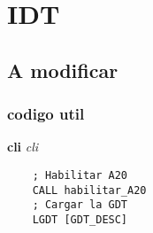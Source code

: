 
\section{IDT}
\subsection{A modificar}
\subsubsection{codigo util}
\textbf{cli} \textit{cli}

\begin{codesnippet}
\begin{verbatim}
    ; Habilitar A20
    CALL habilitar_A20
    ; Cargar la GDT
    LGDT [GDT_DESC]
\end{verbatim}
\end{codesnippet}
